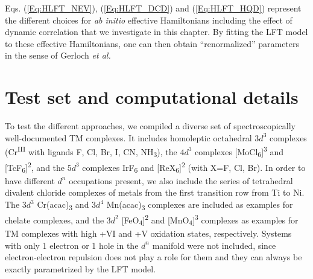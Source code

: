 Eqs. (\ref{Eq:HLFT_NEV}), (\ref{Eq:HLFT_DCD}) and (\ref{Eq:HLFT_HQD}) represent the different choices for \textit{ab initio} effective Hamiltonians including the effect of dynamic correlation that we investigate in this chapter. By fitting the LFT model to these effective Hamiltonians, one can then obtain “renormalized” parameters in the sense of Gerloch \textit{et al.}\cite{GerloHW_1981_1}

\section{Test set and computational details}
To test the different approaches, we compiled a diverse set of spectroscopically well-documented TM complexes. It includes homoleptic octahedral $3d^3$ complexes (Cr\textsuperscript{III} with ligands F\textsuperscript{\textminus}, Cl\textsuperscript{\textminus}, Br\textsuperscript{\textminus}, I\textsuperscript{\textminus}, CN\textsuperscript{\textminus}, NH\textsubscript{3}), the $4d^3$ complexes [MoCl\textsubscript{6}]\textsuperscript{3\textminus} and [TcF\textsubscript{6}]\textsuperscript{2\textminus}, and the $5d^3$ complexes IrF\textsubscript{6} and [ReX\textsubscript{6}]\textsuperscript{2\textminus} (with X=F, Cl, Br). In order to have different $d^n$ occupations present, we also include the series of tetrahedral divalent chloride complexes of metals from the first transition row from Ti to Ni. The $3d^3$ Cr(acac)\textsubscript{3} and $3d^4$ Mn(acac)\textsubscript{3} complexes are included as examples for chelate complexes, and the $3d^2$ [FeO\textsubscript{4}]\textsuperscript{2\textminus} and [MnO\textsubscript{4}]\textsuperscript{3\textminus} complexes as examples for TM complexes with high +VI and +V oxidation states, respectively. Systems with only 1 electron or 1 hole in the $d^n$ manifold were not included, since electron-electron repulsion does not play a role for them and they can always be exactly parametrized by the LFT model.

